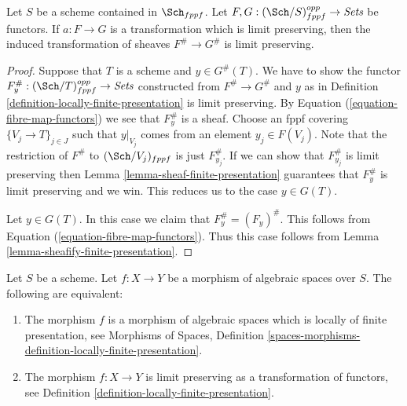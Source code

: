 \begin{lemma}
\label{lemma-sheafify-finite-presentation-map}
Let $S$ be a scheme contained in $\Sch_{fppf}$.
Let $F, G : (\Sch/S)_{fppf}^{opp} \to \textit{Sets}$ be functors.
If $a : F \to G$ is a transformation which is limit preserving,
then the induced transformation of sheaves
$F^\# \to G^\#$ is limit preserving.
\end{lemma}

\begin{proof}
Suppose that $T$ is a scheme and $y \in G^\#(T)$.
We have to show the functor
$F^\#_y : (\Sch/T)_{fppf}^{opp} \to \textit{Sets}$
constructed from $F^\# \to G^\#$ and $y$ as in
Definition \ref{definition-locally-finite-presentation}
is limit preserving.
By Equation (\ref{equation-fibre-map-functors})
we see that $F^\#_y$ is a sheaf. Choose an fppf covering
$\{V_j \to T\}_{j \in J}$ such that $y|_{V_j}$ comes from
an element $y_j \in F(V_j)$.
Note that the restriction of $F^\#$ to $(\Sch/V_j)_{fppf}$
is just $F^\#_{y_j}$. If we can show that $F^\#_{y_j}$ is
limit preserving then
Lemma \ref{lemma-sheaf-finite-presentation}
guarantees that $F^\#_y$ is limit preserving and
we win. This reduces us to the case $y \in G(T)$.

\medskip\noindent
Let $y \in G(T)$. In this case we claim that $F^\#_y = (F_y)^\#$.
This follows from
Equation (\ref{equation-fibre-map-functors}).
Thus this case follows from
Lemma \ref{lemma-sheafify-finite-presentation}.
\end{proof}

\begin{proposition}
\label{proposition-characterize-locally-finite-presentation}
Let $S$ be a scheme. Let $f : X \to Y$ be a morphism of algebraic
spaces over $S$. The following are equivalent:
\begin{enumerate}
\item The morphism $f$ is a morphism of algebraic spaces which is
locally of finite presentation, see
Morphisms of Spaces,
Definition \ref{spaces-morphisms-definition-locally-finite-presentation}.
\item The morphism $f : X \to Y$ is limit preserving as
a transformation of functors, see
Definition \ref{definition-locally-finite-presentation}.
\end{enumerate}
\end{proposition}

